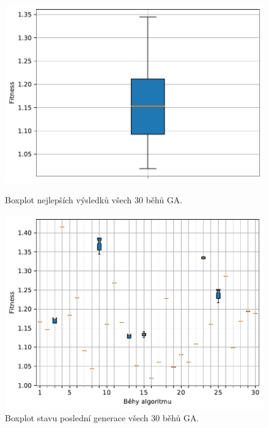 \begin{figure}[H]
\begin{minipage}[t]{0.475\linewidth}
\includegraphics[width=\linewidth]{obrazky-figures/statistics/Benchmarks/Griewank/GA/bestsBoxplot_WithOutliers.pdf}
\caption{Boxplot nejlepších výsledků všech $30$ běhů GA.}
\label{fg:bench:griewank:ga:best}
\end{minipage}
\hfill
\begin{minipage}[t]{0.475\linewidth}
\includegraphics[width=\linewidth]{obrazky-figures/statistics/Benchmarks/Griewank/GA/lastGenBoxplots.pdf}
\caption{Boxplot stavu poslední generace všech $30$ běhů GA.}
\label{fg:bench:griewank:ga:lastGen}
\end{minipage}
\end{figure}

